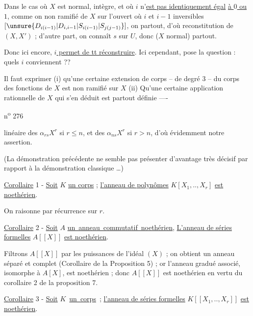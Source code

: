 Dans le cas où $X$ est normal, intègre, et où $i$ n'\uline{est pas identiquement égal} \uline{à $0$ ou $1$}, comme on    non ramifié de $X$ sur l'ouvert  où $i$ et $i-1$ inversibles $[\unsure{D_{i(i-1)}|D_{i,i-1}|S_{i(i-1)}|S_{j(j-1)}}]$, on   partout, d'où reconstitution de $(X,X')$ ; d'autre part, on connaît $s$ sur $U$, donc ($X$ normal) partout.

Donc ici encore, \uline{$i$ permet de tt réconstruire}. Ici cependant,  pose la question : quels $i$ conviennent ??

Il faut exprimer (i) qu'une certaine extension de corps -- de degré $3$ -- du corps des fonctions de $X$ est non ramifié sur $X$ (ii) Qu'une certaine application rationnelle de $X$ qui s'en déduit est partout définie ----

n\textsuperscript{o} 276

linéaire des $\alpha_{rs}X^r$ si $r\leq n$, et des $\alpha_{ns}X^r$ si $r>n$, d'où évidemment notre assertion.

(La démonstration précédente ne semble pas présenter d'avantage très décisif par rapport à la démonstration classique \ldots)

\uline{Corollaire} 1 - \uline{Soit} $K$ \uline{un corps} ; \uline{l'anneau de polynômes} $K[X_1,..,X_r]$ \uline{est noethérien}.

On raisonne par récurrence sur $r$.

\uline{Corollaire} 2 - \uline{Soit} $A$ \mbox{\settowidth{\unitlength}{un anneau commutatif noethérien,}\uline{un anneau commutatif noethérien},} \uline{L'anneau de séries formelles} $A[[X]]$ \uline{est noethérien}.

Filtrons $A[[X]]$ par les puissances de l'idéal $(X)$ ; on obtient un anneau séparé et complet (Corollaire de la Proposition 5) ; or l'anneau gradué associé, isomorphe à $A[X]$, est noethérien ; donc $A[[X]]$ est noethérien en vertu du corollaire 2 de la proposition 7.

\uline{Corollaire} 3 - \uline{Soit} \mbox{\settowidth{\unitlength}{$K$ un corps ;}$K$ \uline{un corps} ;} \uline{l'anneau de séries formelles} $K[[X_1,..,X_r]]$ \uline{est noethérien}.

